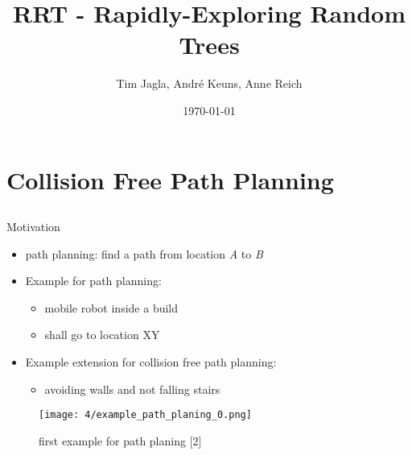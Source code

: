 \documentclass[%
  professionalfonts,%
  xcolor={%
    usenames,%
    dvipsnames,%
    svgnames,%
    table,%
    hyperref%
  }%
]{beamer}
\title{RRT - Rapidly-Exploring Random Trees}
\author{Tim Jagla, André Keuns, Anne Reich}
\institute[FIN]{Otto-von-Guericke-Universität Magdeburg}
\date{\today}
\begin{document}
  \begin{frame}
    \titlepage
  \end{frame}
  
  \section{Collision Free Path Planning}
    \begin{frame}
      \huge{}
    \end{frame}
    
    \subsection*{}
      \begin{frame}{Motivation}
        \begin{itemize}
          \item path planning: find a path from location \emph{A} to \emph{B}
          \item Example for path planning:
          \begin{itemize}
            \item mobile robot inside a build
            \item shall go to location XY
          \end{itemize}
          \item Example extension for collision free path planning:
          \begin{itemize}
            \item avoiding walls and not falling stairs
          \end{itemize}
        \end{itemize}
        
        \begin{figure}[h]
          \texttt{[image: 4/example\_path\_planing\_0.png]}
          \caption{first example for path planing [2]}
          \label{fig:example path planing 0}
        \end{figure}
      \end{frame}
    
\end{document}
